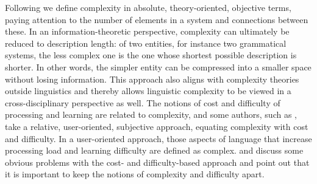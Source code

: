\documentclass[output=collectionpaper]{langsci/langscibook}
\begin{document}
Following \citet{Miestamo2006,Miestamo2008} we define complexity in absolute, theory-oriented, objective terms, paying attention to the number of elements in a system and connections between these.
In an information-theoretic perspective, complexity can ultimately be reduced to description length: of two entities, for instance two grammatical systems, the less complex one is the one whose shortest possible description is shorter. In other words, the simpler entity can be compressed into a smaller space without losing information. This approach also aligns with complexity theories outside linguistics and thereby allows linguistic complexity to be viewed in a cross-disciplinary perspective as well.
The notions of cost and difficulty of processing and learning are related to complexity, and some authors, such as \citet{Kusters2003}, take a relative, user-oriented, subjective approach, equating complexity with cost and difficulty. In a user-oriented approach, those aspects of language that increase processing load and learning difficulty are defined as complex. \citet{Dahl2004} and \citet{Miestamo2006,Miestamo2008} discuss some obvious problems with the cost- and difficulty-based approach and point out that it is important to keep the notions of complexity and difficulty apart.
\end{document}
